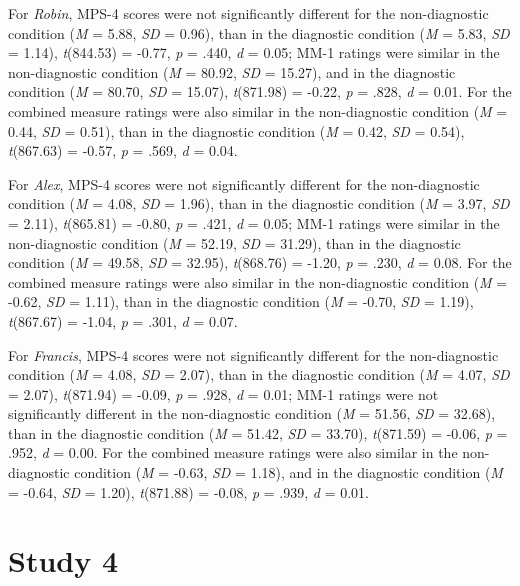 \documentclass[
  american,
  man,floatsintext]{apa7}
\begin{document}
For \emph{Robin}, MPS-4 scores were not significantly different for the non-diagnostic condition (\emph{M} = 5.88, \emph{SD} = 0.96), than in the diagnostic condition (\emph{M} = 5.83, \emph{SD} = 1.14), \emph{t}(844.53) = -0.77, \emph{p} = .440, \emph{d} = 0.05; MM-1 ratings were similar in the non-diagnostic condition (\emph{M} = 80.92, \emph{SD} = 15.27), and in the diagnostic condition (\emph{M} = 80.70, \emph{SD} = 15.07), \emph{t}(871.98) = -0.22, \emph{p} = .828, \emph{d} = 0.01. For the combined measure ratings were also similar in the non-diagnostic condition (\emph{M} = 0.44, \emph{SD} = 0.51), than in the diagnostic condition (\emph{M} = 0.42, \emph{SD} = 0.54), \emph{t}(867.63) = -0.57, \emph{p} = .569, \emph{d} = 0.04.

For \emph{Alex}, MPS-4 scores were not significantly different for the non-diagnostic condition (\emph{M} = 4.08, \emph{SD} = 1.96), than in the diagnostic condition (\emph{M} = 3.97, \emph{SD} = 2.11), \emph{t}(865.81) = -0.80, \emph{p} = .421, \emph{d} = 0.05; MM-1 ratings were similar in the non-diagnostic condition (\emph{M} = 52.19, \emph{SD} = 31.29), than in the diagnostic condition (\emph{M} = 49.58, \emph{SD} = 32.95), \emph{t}(868.76) = -1.20, \emph{p} = .230, \emph{d} = 0.08. For the combined measure ratings were also similar in the non-diagnostic condition (\emph{M} = -0.62, \emph{SD} = 1.11), than in the diagnostic condition (\emph{M} = -0.70, \emph{SD} = 1.19), \emph{t}(867.67) = -1.04, \emph{p} = .301, \emph{d} = 0.07.

For \emph{Francis}, MPS-4 scores were not significantly different for the non-diagnostic condition (\emph{M} = 4.08, \emph{SD} = 2.07), than in the diagnostic condition (\emph{M} = 4.07, \emph{SD} = 2.07), \emph{t}(871.94) = -0.09, \emph{p} = .928, \emph{d} = 0.01; MM-1 ratings were not significantly different in the non-diagnostic condition (\emph{M} = 51.56, \emph{SD} = 32.68), than in the diagnostic condition (\emph{M} = 51.42, \emph{SD} = 33.70), \emph{t}(871.59) = -0.06, \emph{p} = .952, \emph{d} = 0.00. For the combined measure ratings were also similar in the non-diagnostic condition (\emph{M} = -0.63, \emph{SD} = 1.18), and in the diagnostic condition (\emph{M} = -0.64, \emph{SD} = 1.20), \emph{t}(871.88) = -0.08, \emph{p} = .939, \emph{d} = 0.01.

\newpage

\hypertarget{study-4}{%
\section{Study 4}\label{study-4}}
\end{document}
